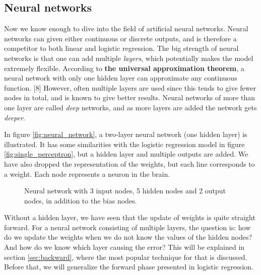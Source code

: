 \subsection{Neural networks} \label{sec:neural_network}
Now we know enough to dive into the field of artificial neural networks. Neural networks can given either continuous or discrete outputs, and is therefore a competitor to both linear and logistic regression. The big strength of neural networks is that one can add multiple \textit{layers}, which potentially makes the model extremely flexible. According to \textbf{the universal approximation theorem}, a neural network with only one hidden layer can approximate any continuous function. [8] However, often multiple layers are used since this tends to give fewer nodes in total, and is known to give better results. Neural networks of more than one layer are called \textit{deep} networks, and as more layers are added the network gets \textit{deeper}.

In figure \eqref{fig:neural_network}, a two-layer neural network (one hidden layer) is illustrated. It has some similarities with the logistic regression model in figure \eqref{fig:single_perceptron}, but a hidden layer and multiple outputs are added. We have also dropped the representation of the weights, but each line corresponds to a weight. Each node represents a neuron in the brain.

\begin{figure}
	\centering
	
	\caption{Neural network with 3 input nodes, 5 hidden nodes and 2 output nodes, in addition to the bias nodes.}
	\label{fig:neural_network}
\end{figure}

Without a hidden layer, we have seen that the update of weights is quite straight forward. For a neural network consisting of multiple layers, the question is: how do we update the weights when we do not know the values of the hidden nodes? And how do we know which layer causing the error? This will be explained in section \ref{sec:backward}, where the most popular technique for that is discussed. Before that, we will generalize the forward phase presented in logistic regression.

